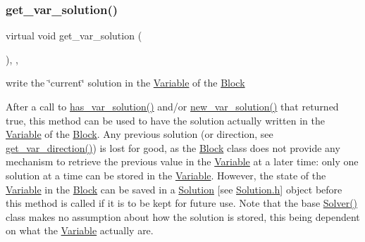 \subsubsection{\texorpdfstring{get\+\_\+var\+\_\+solution()}{get\_var\_solution()}}
{\footnotesize\ttfamily virtual void get\+\_\+var\+\_\+solution (\begin{DoxyParamCaption}\item[{void}]{ }\end{DoxyParamCaption})\hspace{0.3cm}{\ttfamily [inline]}, {\ttfamily [override]}, {\ttfamily [virtual]}}



write the \char`\"{}current\char`\"{} solution in the \mbox{\hyperlink{class_s_m_spp__di__unipi__it_1_1_variable}{Variable}} of the \mbox{\hyperlink{class_s_m_spp__di__unipi__it_1_1_block}{Block}} 

After a call to \mbox{\hyperlink{class_s_m_spp__di__unipi__it_1_1_m_c_f_solver_ade6d8078e2b6708ea0fa989629de2419}{has\+\_\+var\+\_\+solution()}} and/or \mbox{\hyperlink{class_s_m_spp__di__unipi__it_1_1_m_c_f_solver_a62678dc9f7485d5a2992c588c5dc7d49}{new\+\_\+var\+\_\+solution()}} that returned true, this method can be used to have the solution actually written in the \mbox{\hyperlink{class_s_m_spp__di__unipi__it_1_1_variable}{Variable}} of the \mbox{\hyperlink{class_s_m_spp__di__unipi__it_1_1_block}{Block}}. Any previous solution (or direction, see \mbox{\hyperlink{class_s_m_spp__di__unipi__it_1_1_m_c_f_solver_af6cbccb8671398cc84c4e0a730a03285}{get\+\_\+var\+\_\+direction()}}) is lost for good, as the \mbox{\hyperlink{class_s_m_spp__di__unipi__it_1_1_block}{Block}} class does not provide any mechanism to retrieve the previous value in the \mbox{\hyperlink{class_s_m_spp__di__unipi__it_1_1_variable}{Variable}} at a later time\+: only one solution at a time can be stored in the \mbox{\hyperlink{class_s_m_spp__di__unipi__it_1_1_variable}{Variable}}. However, the state of the \mbox{\hyperlink{class_s_m_spp__di__unipi__it_1_1_variable}{Variable}} in the \mbox{\hyperlink{class_s_m_spp__di__unipi__it_1_1_block}{Block}} can be saved in a \mbox{\hyperlink{class_s_m_spp__di__unipi__it_1_1_solution}{Solution}} \mbox{[}see \mbox{\hyperlink{_solution_8h}{Solution.\+h}}\mbox{]} object before this method is called if it is to be kept for future use. Note that the base \mbox{\hyperlink{class_s_m_spp__di__unipi__it_1_1_solver_a6a5e38de103dc5a46feb9bd4ac48c3d5}{Solver()}} class makes no assumption about how the solution is stored, this being dependent on what the \mbox{\hyperlink{class_s_m_spp__di__unipi__it_1_1_variable}{Variable}} actually are.

